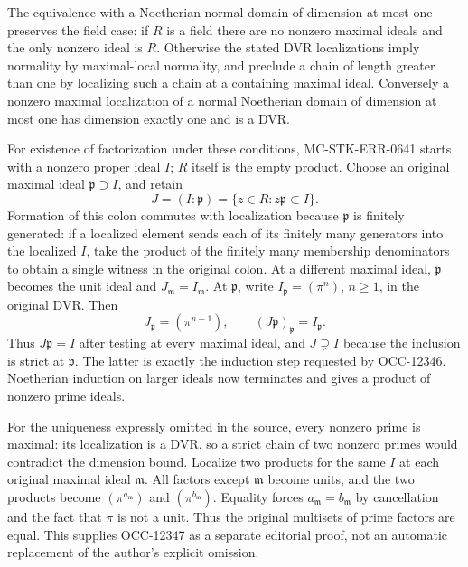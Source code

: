 The equivalence with a Noetherian normal domain of dimension at most one preserves the field case: if \(R\) is a field there are no nonzero maximal ideals and the only nonzero ideal is \(R\). Otherwise the stated DVR localizations imply normality by maximal-local normality, and preclude a chain of length greater than one by localizing such a chain at a containing maximal ideal. Conversely a nonzero maximal localization of a normal Noetherian domain of dimension at most one has dimension exactly one and is a DVR.

For existence of factorization under these conditions, MC-STK-ERR-0641 starts with a nonzero proper ideal \(I\); \(R\) itself is the empty product. Choose an original maximal ideal \(\mathfrak p\supset I\), and retain \[
 J=(I:\mathfrak p)=\{z\in R:z\mathfrak p\subset I\}.
\] Formation of this colon commutes with localization because \(\mathfrak p\) is finitely generated: if a localized element sends each of its finitely many generators into the localized \(I\), take the product of the finitely many membership denominators to obtain a single witness in the original colon. At a different maximal ideal, \(\mathfrak p\) becomes the unit ideal and \(J_{\mathfrak m}=I_{\mathfrak m}\). At \(\mathfrak p\), write \(I_{\mathfrak p}=(\pi^n)\), \(n\ge1\), in the original DVR. Then \[
 J_{\mathfrak p}=(\pi^{n-1}),\qquad
 (J\mathfrak p)_{\mathfrak p}=I_{\mathfrak p}.
\] Thus \(J\mathfrak p=I\) after testing at every maximal ideal, and \(J\supsetneq I\) because the inclusion is strict at \(\mathfrak p\). The latter is exactly the induction step requested by OCC-12346. Noetherian induction on larger ideals now terminates and gives a product of nonzero prime ideals.

For the uniqueness expressly omitted in the source, every nonzero prime is maximal: its localization is a DVR, so a strict chain of two nonzero primes would contradict the dimension bound. Localize two products for the same \(I\) at each original maximal ideal \(\mathfrak m\). All factors except \(\mathfrak m\) become units, and the two products become \((\pi^{a_{\mathfrak m}})\) and \((\pi^{b_{\mathfrak m}})\). Equality forces \(a_{\mathfrak m}=b_{\mathfrak m}\) by cancellation and the fact that \(\pi\) is not a unit. Thus the original multisets of prime factors are equal. This supplies OCC-12347 as a separate editorial proof, not an automatic replacement of the author's explicit omission.

